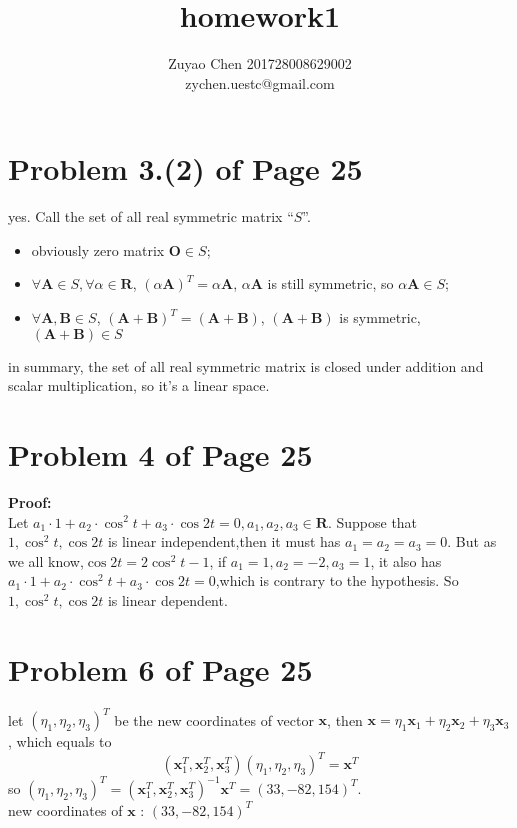 \documentclass[12pt,a4paper]{article}
\title{homework1}
\author{Zuyao Chen 201728008629002 \\ zychen.uestc@gmail.com}
\date{}
\newcommand{\mysection}[2]{
\section{Problem #1 of Page #2}	
	}
\begin{document}
\maketitle
\mysection{3.(2)}{25}
yes. 
Call the set of all real symmetric matrix ``${S}$''.
\begin{itemize}
	\item obviously zero matrix $\bm O \in {S}$;
	\item $\forall \bm A \in {S},\forall \alpha \in \mathbf{R}$, 
			$(\alpha \bm{A})^{T} = \alpha \bm{A}$, $\alpha \bm{A}$ is still symmetric,
			so $\alpha \bm{A} \in  {S}$;
	\item $\forall \bm{A} , \bm{B} \in  {S}$, $(\bm{A}+\bm{B})^{T} = (\bm{A}+\bm{B})$,
			$(\bm{A}+\bm{B})$ is symmetric, $(\bm{A}+\bm{B}) \in  {S}$		
\end{itemize}
in summary,	the set of all real symmetric matrix is closed under addition and scalar multiplication, so it's a linear space.
\mysection{4}{25}
\textbf{Proof:} \\
\indent Let
$a_1 \cdot 1 + a_2 \cdot \cos^{2}t + a_3 \cdot \cos 2t = 0,a_1,a_2,a_3 \in \mathbf{R}$.
Suppose that $1, \cos^{2} t, \cos 2t$ is linear independent,then 
it must has $ a_1 = a_2 = a_3 = 0$.
But as we all know,$\cos 2t = 2\cos^{2} t - 1$,
if $a_1 = 1, a_2 = -2 , a_3 = 1$, it also has $a_1 \cdot 1 + a_2 \cdot \cos^{2}t + a_3 \cdot \cos 2t = 0$,which is contrary to the hypothesis.
So $1, \cos^{2} t, \cos 2t$ is linear dependent.

\mysection{6}{25}
let $(\eta_1,\eta_2,\eta_3)^{T}$ be the new coordinates of vector $\bm{x}$,
then 
$\bm{x}= \eta_1\bm{x}_1 + \eta_2\bm{x}_2+ \eta_3\bm{x}_3 $,
which equals to 
\[
(\bm{x}_1^{T},\bm{x}_2^{T},\bm{x}_3^{T}) (\eta_1,\eta_2,\eta_3)^{T} = \bm{x}^{T}
\]
so $(\eta_1,\eta_2,\eta_3)^{T} 
= (\bm{x}_1^{T},\bm{x}_2^{T},\bm{x}_3^{T})^{-1}\bm{x}^{T} 
= (33,-82,154)^{T}$.\\
new coordinates of $\bm{x}$ : $(33,-82,154)^{T}$
\end{document}
